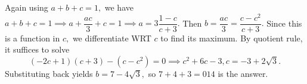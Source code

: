 \begin{enumerate}
 Again using $a+b+c=1,$ we have $a+b+c=1\implies a+\dfrac{ac}{3}+c=1\implies a=3\dfrac{1-c}{c+3}.$ Then $b=\dfrac{ac}{3}=\dfrac{c-c^2}{c+3}.$ Since this is a function in $c,$ we differentiate WRT $c$ to find its maximum. By quotient rule, it suffices to solve 
 \[(-2c+1)(c+3)-(c-c^2)=0 \implies c^2+6c-3,c=-3+2\sqrt{3}.\] Substituting back yields $b=7-4\sqrt{3},$ so $7+4+3=\boxed{014}$ is the answer.

 


 


 


\end{enumerate}